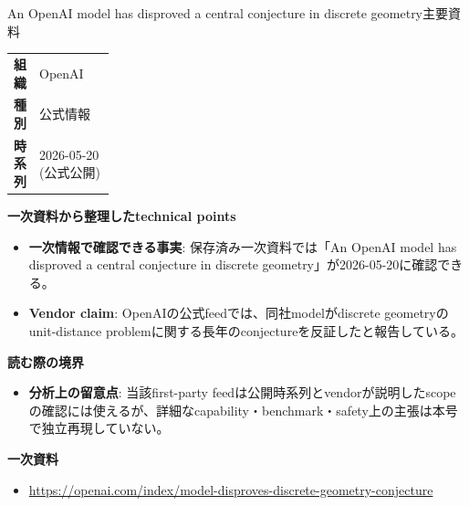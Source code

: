\begin{technicalnote}{An OpenAI model has disproved a central conjecture in discrete geometry}{主要資料}
\begingroup
\begin{tabularx}{\linewidth}{@{}>{\bfseries}p{0.22\linewidth}X@{}}
組織 & OpenAI \\
種別 & 公式情報 \\
時系列 & 2026-05-20 (公式公開) \\
\end{tabularx}
\smallskip
{\bfseries 一次資料から整理したtechnical points}
\begin{itemize}[leftmargin=1.5em,itemsep=0.35em]
\item \textbf{一次情報で確認できる事実}: 保存済み一次資料では「An OpenAI model has disproved a central conjecture in discrete geometry」が2026-05-20に確認できる。
\item \textbf{Vendor claim}: OpenAIの公式feedでは、同社modelがdiscrete geometryのunit-distance problemに関する長年のconjectureを反証したと報告している。
\end{itemize}
{\bfseries 読む際の境界}
\begin{itemize}[leftmargin=1.5em,itemsep=0.35em]
\item \textbf{分析上の留意点}: 当該first-party feedは公開時系列とvendorが説明したscopeの確認には使えるが、詳細なcapability・benchmark・safety上の主張は本号で独立再現していない。
\end{itemize}
\begin{samepage}
{\bfseries 一次資料}
\begingroup\sloppy
\begin{itemize}[leftmargin=1.5em,itemsep=0.25em]
\item {\scriptsize\url{https://openai.com/index/model-disproves-discrete-geometry-conjecture}}
\end{itemize}
\endgroup
\end{samepage}
\endgroup
\end{technicalnote}
\medskip

